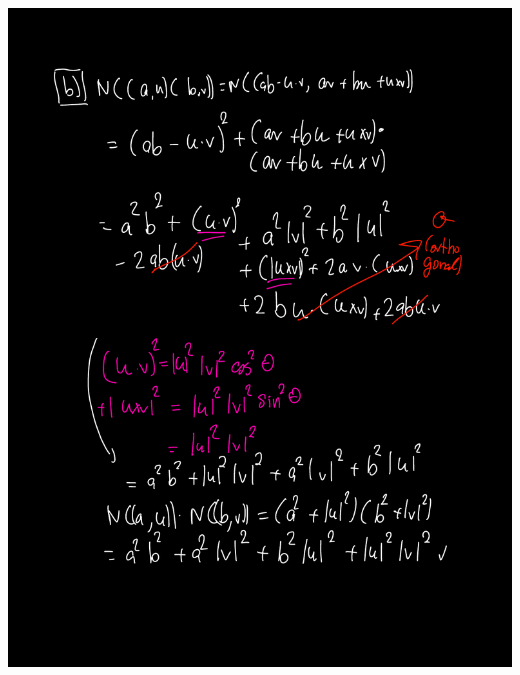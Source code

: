 \documentclass[12pt]{article}
\theoremstyle{definitionstyle}
\begin{document}
		\newpage
		\includegraphics[scale=0.75,page=1]{q5.pdf}
\end{document}
